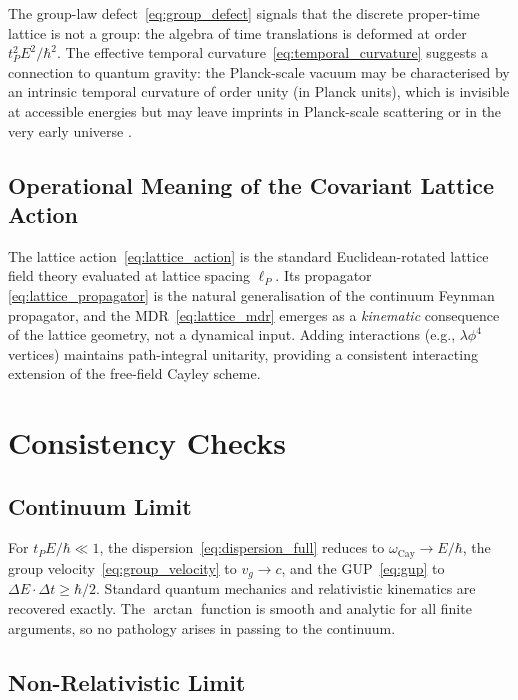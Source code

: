 \documentclass[12pt,a4paper]{article}
\begin{document}
The group-law defect~\eqref{eq:group_defect} signals that the discrete proper-time lattice
is not a group: the algebra of time translations is deformed at order $t_P^2 E^2/\hbar^2$.
The effective temporal curvature~\eqref{eq:temporal_curvature} suggests a connection to
quantum gravity: the Planck-scale vacuum may be characterised by an intrinsic temporal
curvature of order unity (in Planck units), which is invisible at accessible energies but
may leave imprints in Planck-scale scattering or in the very early universe \cite{thiemann1996}.

\subsection{Operational Meaning of the Covariant Lattice Action}

The lattice action~\eqref{eq:lattice_action} is the standard Euclidean-rotated lattice
field theory \cite{maldacena1997} evaluated at lattice spacing $\ell_P$.  Its propagator
\eqref{eq:lattice_propagator} is the natural generalisation of the continuum Feynman
propagator, and the MDR~\eqref{eq:lattice_mdr} emerges as a \emph{kinematic} consequence
of the lattice geometry, not a dynamical input.  Adding interactions (e.g., $\lambda\phi^4$
vertices) maintains path-integral unitarity, providing a consistent interacting extension
of the free-field Cayley scheme.

\section{Consistency Checks}
\label{sec:consistency}

\subsection{Continuum Limit}
\label{sec:continuum_limit}

For $t_P E/\hbar \ll 1$, the dispersion~\eqref{eq:dispersion_full} reduces to
$\omega_{\mathrm{Cay}} \to E/\hbar$, the group velocity~\eqref{eq:group_velocity} to
$v_g \to c$, and the GUP~\eqref{eq:gup} to $\Delta E \cdot \Delta t \geq \hbar/2$.
Standard quantum mechanics and relativistic kinematics are recovered exactly.  The
$\arctan$ function is smooth and analytic for all finite arguments, so no pathology arises
in passing to the continuum.

\subsection{Non-Relativistic Limit}
\label{sec:nr_limit}
\end{document}
